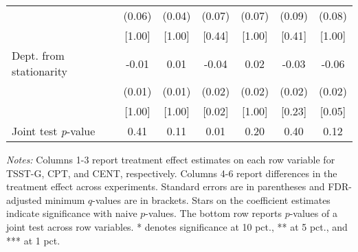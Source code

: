 \begin{table}[htbp]
{\begin{threeparttable}
\begin{tabular}{l*{6}{c}}
          &   (0.06)&   (0.04)&   (0.07)&   (0.07)&   (0.09)&   (0.08)\\
          &   [1.00]&   [1.00]&   [0.44]&   [1.00]&   [0.41]&   [1.00]\\
Dept. from stationarity&    -0.01&     0.01&-0.04\sym{***}&     0.02&-0.03\sym{*}&-0.06\sym{***}\\
          &   (0.01)&   (0.01)&   (0.02)&   (0.02)&   (0.02)&   (0.02)\\
          &   [1.00]&   [1.00]&[0.02\sym{**}]&   [1.00]&   [0.23]&[0.05\sym{*}]\\
\midrule Joint test \emph{p}-value&     0.41&     0.11&0.01\sym{***}&     0.20&     0.40&     0.12\\
\bottomrule \end{tabular} \begin{tablenotes}[flushleft] \footnotesize \item \emph{Notes:} Columns 1-3 report treatment effect estimates on each row variable for TSST-G, CPT, and CENT, respectively. Columns 4-6 report differences in the treatment effect across experiments. Standard errors are in parentheses and FDR-adjusted minimum \(q\)-values are in brackets. Stars on the coefficient estimates indicate significance with naive \(p\)-values. The bottom row reports \(p\)-values of a joint test across row variables. * denotes significance at 10 pct., ** at 5 pct., and *** at 1 pct. \end{tablenotes} \end{threeparttable} } \end{table}
